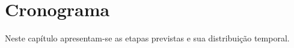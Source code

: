 \chapter{Cronograma}
\label{cha:crono}


Neste capítulo apresentam-se as etapas previstas e sua distribuição temporal.



